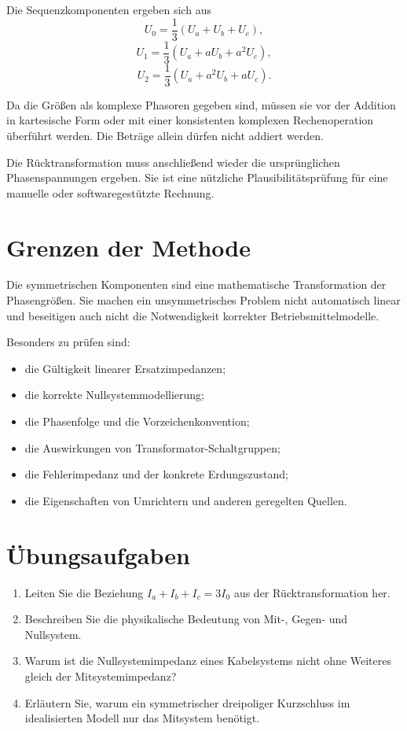 Die Sequenzkomponenten ergeben sich aus
\[
  U_0=\frac13(U_a+U_b+U_c),
\]
\[
  U_1=\frac13(U_a+aU_b+a^2U_c),
\]
\[
  U_2=\frac13(U_a+a^2U_b+aU_c).
\]

Da die Größen als komplexe Phasoren gegeben sind, müssen sie vor der
Addition in kartesische Form oder mit einer konsistenten komplexen
Rechenoperation überführt werden. Die Beträge allein dürfen nicht addiert
werden.

Die Rücktransformation muss anschließend wieder die ursprünglichen
Phasenspannungen ergeben. Sie ist eine nützliche Plausibilitätsprüfung
für eine manuelle oder softwaregestützte Rechnung.

\section{Grenzen der Methode}

Die symmetrischen Komponenten sind eine mathematische Transformation
der Phasengrößen. Sie machen ein unsymmetrisches Problem nicht automatisch
linear und beseitigen auch nicht die Notwendigkeit korrekter Betriebsmittelmodelle.

Besonders zu prüfen sind:
\begin{itemize}
  \item die Gültigkeit linearer Ersatzimpedanzen;
  \item die korrekte Nullsystemmodellierung;
  \item die Phasenfolge und die Vorzeichenkonvention;
  \item die Auswirkungen von Transformator-Schaltgruppen;
  \item die Fehlerimpedanz und der konkrete Erdungszustand;
  \item die Eigenschaften von Umrichtern und anderen geregelten Quellen.
\end{itemize}

\section{Übungsaufgaben}

\begin{enumerate}
  \item Leiten Sie die Beziehung \(I_a+I_b+I_c=3I_0\) aus der
        Rücktransformation her.
  \item Beschreiben Sie die physikalische Bedeutung von Mit-, Gegen-
        und Nullsystem.
  \item Warum ist die Nullsystemimpedanz eines Kabelsystems nicht
        ohne Weiteres gleich der Mitsystemimpedanz?
  \item Erläutern Sie, warum ein symmetrischer dreipoliger Kurzschluss
        im idealisierten Modell nur das Mitsystem benötigt.
\end{enumerate}